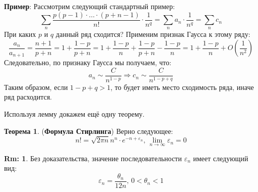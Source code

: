 \documentclass[12pt]{article}
\theoremstyle{definition}
\newtheorem{rem}{Rm:}
\newtheorem{theorem}{Теорема}
\begin{document}
\textbf{Пример}: Рассмотрим следующий стандартный пример:
$$
	\sum\limits_n\dfrac{p(p-1){\cdot}\dotsc{\cdot}(p + n-1)}{n!}{\cdot}\dfrac{1}{n^q} = 	\sum\limits_n a_n {\cdot}\dfrac{1}{n^q} = \sum\limits_n c_n
$$
При каких $p$ и $q$ данный ряд сходится? Применим признак Гаусса к этому ряду:
$$
	\dfrac{a_n}{a_{n+1}} = \dfrac{n + 1}{p + n} = 1 + \dfrac{1 - p }{p + n} = 1 + \dfrac{1 - p}{n} + \dfrac{1 - p }{p + n} - \dfrac{1 - p}{n} = 1 + \dfrac{1-p}{n} + O\left(\dfrac{1}{n^2}\right)
$$
Следовательно, по признаку Гаусса мы получаем, что:
$$
	a_n \sim \dfrac{C}{n^{1-p}} \Rightarrow c_n \sim \dfrac{C}{n^{1-p + q}}
$$
Таким образом, если $1 - p + q > 1$, то будет иметь место сходимость ряда, иначе ряд расходится.

Используя лемму докажем ещё одну теорему.
\begin{theorem}(\textbf{Формула Стирлинга})
	Верно следующее:
	$$
		n! = \sqrt{2\pi n} n^n{\cdot}e^{-n + \varepsilon_n}, \, \lim\limits_{n \to \infty}\varepsilon_n = 0
	$$
\end{theorem}
\begin{rem}
	Без доказательства, значение последовательности $\varepsilon_n$ имеет следующий вид:
	$$
		\varepsilon_n = \dfrac{\theta_n}{12n}, \, 0 < \theta_n < 1
	$$
\end{rem}
\end{document}
